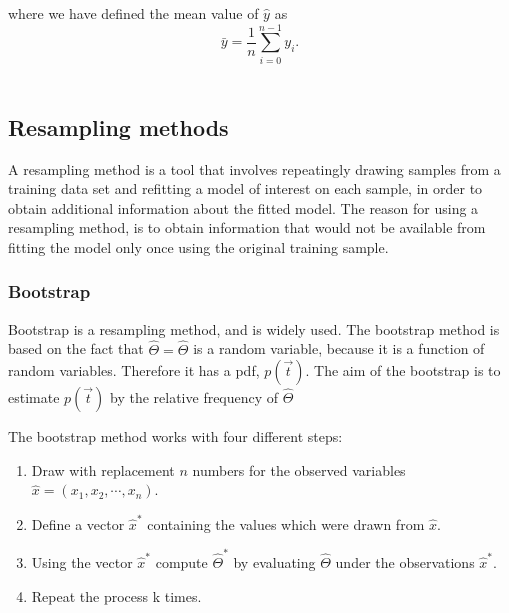 where we have defined the mean value  of $\hat{y}$ as
\begin{equation}
\bar{y} =  \frac{1}{n} \sum_{i=0}^{n - 1} y_i.
\end{equation}~\cite{Project1}

\subsection{Resampling methods}
A resampling method is a tool that involves 
repeatingly drawing samples from a training data set and refitting a model
of interest on each sample, in order to obtain additional information 
about the fitted model. 
The reason for using a resampling method, is to obtain information that would
not be available from fitting the model only once using the original training
sample. ~\cite{LectureNotes-FysStk}

\subsubsection{Bootstrap}
Bootstrap is a resampling method, and is widely used.
The bootstrap method is based on the fact that \(\hat{\Theta} = \hat{\Theta}\)
is a random variable, because it is a function of random variables. 
Therefore it has a pdf, \(p(\vec{t})\). The aim of the bootstrap is to 
estimate \(p(\vec{t})\) by the relative frequency of \(\hat{\Theta}\)
~\cite{LectureNotes-FysStk}

The bootstrap method works with four different steps: 
\begin{enumerate}
		\item Draw with replacement \(n\) numbers for the observed variables
			\(\hat{x} = (x_1, x_2,\cdots, x_n)\).
		\item Define a vector \(\hat{x}^*\) containing the values which were 
			drawn from \(\hat{x}\). 
		\item Using the vector \(\hat{x}^*\) compute \(\hat{\Theta}^*\)
			by evaluating \(\hat{\Theta}\) under the observations 
			\(\hat{x}^*\).
		\item Repeat the process k times. 
\end{enumerate} 
~\cite{LectureNotes-FysStk}

		







